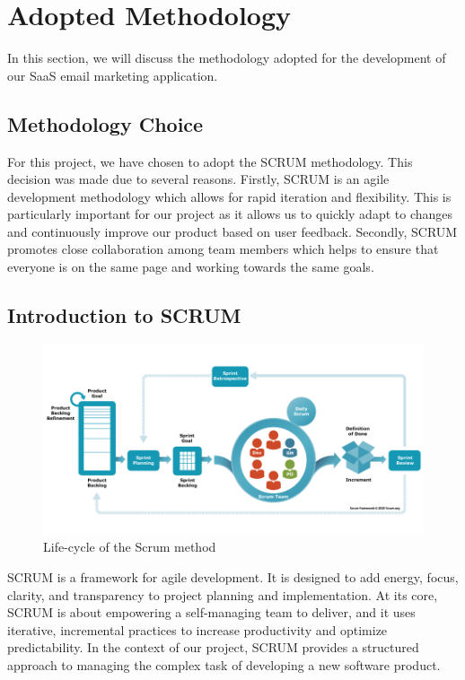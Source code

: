 \section{Adopted Methodology}

In this section, we will discuss the methodology adopted for the development of our SaaS email marketing application.

\subsection{Methodology Choice}

For this project, we have chosen to adopt the SCRUM methodology. This decision was made due to several reasons. Firstly, SCRUM is an agile development methodology which allows for rapid iteration and flexibility. This is particularly important for our project as it allows us to quickly adapt to changes and continuously improve our product based on user feedback. Secondly, SCRUM promotes close collaboration among team members which helps to ensure that everyone is on the same page and working towards the same goals.

\subsection{Introduction to SCRUM}

\begin{figure}[ht]
    \centering
    \includegraphics[width=0.6\linewidth]{Images//images/scrum.png}
    \caption{Life-cycle of the Scrum method}
    \label{fig:Life-cycle of the Scrum method}
\end{figure}

SCRUM is a framework for agile development. It is designed to add energy, focus, clarity, and transparency to project planning and implementation. At its core, SCRUM is about empowering a self-managing team to deliver, and it uses iterative, incremental practices to increase productivity and optimize predictability. In the context of our project, SCRUM provides a structured approach to managing the complex task of developing a new software product.

